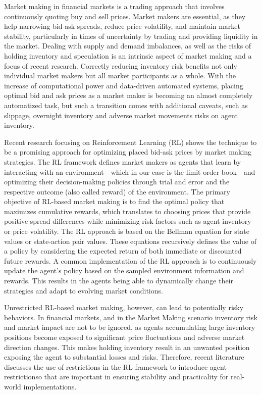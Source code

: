 \documentclass{article}
\begin{document}

\begin{section}

Market making in financial markets is a trading approach that involves continuously quoting buy and sell prices. Market makers are essential, as they help narrowing bid-ask spreads, reduce price volatility, and maintain market stability, particularly in times of uncertainty by trading and providing liquidity in the market. Dealing with supply and demand imbalances, as well as the risks of holding inventory and speculation is an intrinsic aspect of market making and a focus of recent research. Correctly reducing inventory risk benefits not only individual market makers but all market participants as a whole. With the increase of computational power and data-driven automated systems, placing optimal bid and ask prices as a market maker is becoming an almost completely automatized task, but such a transition comes with additional caveats, such as slippage, overnight inventory and adverse market movements risks on agent inventory. 

Recent research focusing on Reinforcement Learning (RL) shows the technique to be a promising approach for optimizing placed bid-ask prices by market making strategies. The RL framework defines market makers as agents that learn by interacting with an environment - which in our case is the limit order book - and optimizing their decision-making policies through trial and error and the respective outcome (also called reward) of the environment. The primary objective of RL-based market making is to find the optimal policy that maximizes cumulative rewards, which translates to choosing prices that provide positive spread differences while minimizing risk factors such as agent inventory or price volatility. The RL approach is based on the Bellman equation for state values or state-action pair values. These equations recursively defines the value of a policy by considering the expected return of both immediate or discounted future rewards. A common implementation of the RL approach is to continuously update the agent's policy based on the sampled environment information and rewards. This results in the agents being able to dynamically change their strategies and adapt to evolving market conditions. 

Unrestricted RL-based market making, however, can lead to potentially risky behaviors. In financial markets, and in the Market Making scenario inventory risk and market impact are not to be ignored, as agents accumulating large inventory positions become exposed to significant price fluctuations and adverse market direction changes. This makes holding inventory result in an unwanted position exposing the agent to substantial losses and risks. Therefore, recent literature discusses the use of restrictions in the RL framework to introduce agent restrictionso that are important in ensuring stability and practicality for real-world implementations. 


\end{section}
\end{document}
